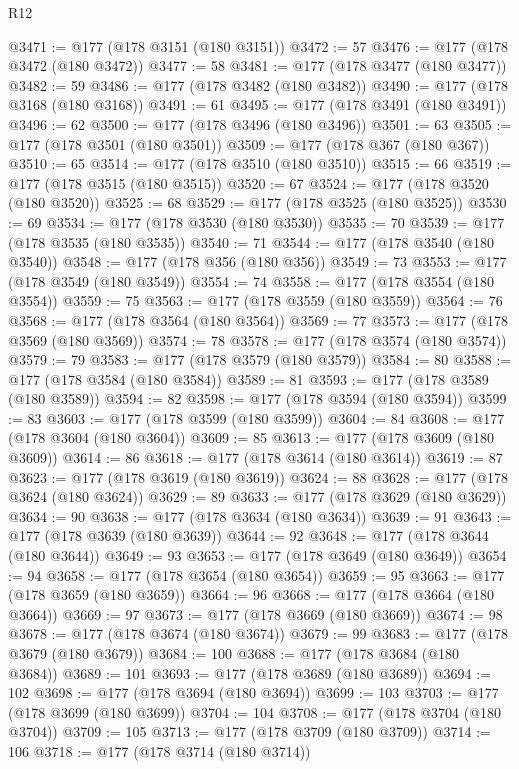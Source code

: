 \begin{lexlean}{R12}
\begin{coremodule}
{{{{{{{{{{{{{{{{{{{{{{{{{{{{{{{{{{{{{{{{{{{{{{{{{{{{{{{{{{{{{{{{{{{{{{{{{{{{{{{{{{@3471 := @177 (@178 @3151 (@180 @3151))
@3472 := 57
@3476 := @177 (@178 @3472 (@180 @3472))
@3477 := 58
@3481 := @177 (@178 @3477 (@180 @3477))
@3482 := 59
@3486 := @177 (@178 @3482 (@180 @3482))
@3490 := @177 (@178 @3168 (@180 @3168))
@3491 := 61
@3495 := @177 (@178 @3491 (@180 @3491))
@3496 := 62
@3500 := @177 (@178 @3496 (@180 @3496))
@3501 := 63
@3505 := @177 (@178 @3501 (@180 @3501))
@3509 := @177 (@178 @367 (@180 @367))
@3510 := 65
@3514 := @177 (@178 @3510 (@180 @3510))
@3515 := 66
@3519 := @177 (@178 @3515 (@180 @3515))
@3520 := 67
@3524 := @177 (@178 @3520 (@180 @3520))
@3525 := 68
@3529 := @177 (@178 @3525 (@180 @3525))
@3530 := 69
@3534 := @177 (@178 @3530 (@180 @3530))
@3535 := 70
@3539 := @177 (@178 @3535 (@180 @3535))
@3540 := 71
@3544 := @177 (@178 @3540 (@180 @3540))
@3548 := @177 (@178 @356 (@180 @356))
@3549 := 73
@3553 := @177 (@178 @3549 (@180 @3549))
@3554 := 74
@3558 := @177 (@178 @3554 (@180 @3554))
@3559 := 75
@3563 := @177 (@178 @3559 (@180 @3559))
@3564 := 76
@3568 := @177 (@178 @3564 (@180 @3564))
@3569 := 77
@3573 := @177 (@178 @3569 (@180 @3569))
@3574 := 78
@3578 := @177 (@178 @3574 (@180 @3574))
@3579 := 79
@3583 := @177 (@178 @3579 (@180 @3579))
@3584 := 80
@3588 := @177 (@178 @3584 (@180 @3584))
@3589 := 81
@3593 := @177 (@178 @3589 (@180 @3589))
@3594 := 82
@3598 := @177 (@178 @3594 (@180 @3594))
@3599 := 83
@3603 := @177 (@178 @3599 (@180 @3599))
@3604 := 84
@3608 := @177 (@178 @3604 (@180 @3604))
@3609 := 85
@3613 := @177 (@178 @3609 (@180 @3609))
@3614 := 86
@3618 := @177 (@178 @3614 (@180 @3614))
@3619 := 87
@3623 := @177 (@178 @3619 (@180 @3619))
@3624 := 88
@3628 := @177 (@178 @3624 (@180 @3624))
@3629 := 89
@3633 := @177 (@178 @3629 (@180 @3629))
@3634 := 90
@3638 := @177 (@178 @3634 (@180 @3634))
@3639 := 91
@3643 := @177 (@178 @3639 (@180 @3639))
@3644 := 92
@3648 := @177 (@178 @3644 (@180 @3644))
@3649 := 93
@3653 := @177 (@178 @3649 (@180 @3649))
@3654 := 94
@3658 := @177 (@178 @3654 (@180 @3654))
@3659 := 95
@3663 := @177 (@178 @3659 (@180 @3659))
@3664 := 96
@3668 := @177 (@178 @3664 (@180 @3664))
@3669 := 97
@3673 := @177 (@178 @3669 (@180 @3669))
@3674 := 98
@3678 := @177 (@178 @3674 (@180 @3674))
@3679 := 99
@3683 := @177 (@178 @3679 (@180 @3679))
@3684 := 100
@3688 := @177 (@178 @3684 (@180 @3684))
@3689 := 101
@3693 := @177 (@178 @3689 (@180 @3689))
@3694 := 102
@3698 := @177 (@178 @3694 (@180 @3694))
@3699 := 103
@3703 := @177 (@178 @3699 (@180 @3699))
@3704 := 104
@3708 := @177 (@178 @3704 (@180 @3704))
@3709 := 105
@3713 := @177 (@178 @3709 (@180 @3709))
@3714 := 106
@3718 := @177 (@178 @3714 (@180 @3714))
}}}}}}}}}}}}}}}}}}}}}}}}}}}}}}}}}}}}}}}}}}}}}}}}}}}}}}}}}}}}}}}}}}}}}}}}}}}}}}}}}}
\end{coremodule}
\end{lexlean}
